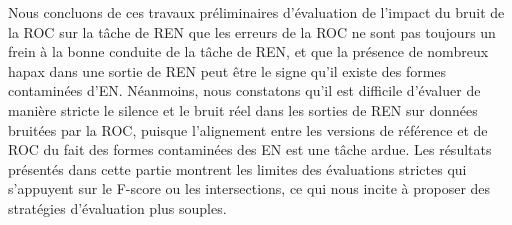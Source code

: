 Nous concluons de ces travaux préliminaires d'évaluation de l'impact du bruit de la ROC sur la tâche de REN que les erreurs de la ROC ne sont pas toujours un frein à la bonne conduite de la tâche de REN, et que la présence de nombreux hapax dans une sortie de REN peut être le signe qu'il existe des formes contaminées d'EN. Néanmoins, nous constatons qu'il est difficile d'évaluer de manière stricte le silence et le bruit réel dans les sorties de REN sur données bruitées par la ROC, puisque l'alignement entre les versions de référence et de ROC du fait des formes contaminées des EN est une tâche ardue. Les résultats présentés dans cette partie montrent les limites des évaluations strictes qui s'appuyent sur le F-score ou les intersections, ce qui nous incite à proposer des stratégies d’évaluation plus souples.


